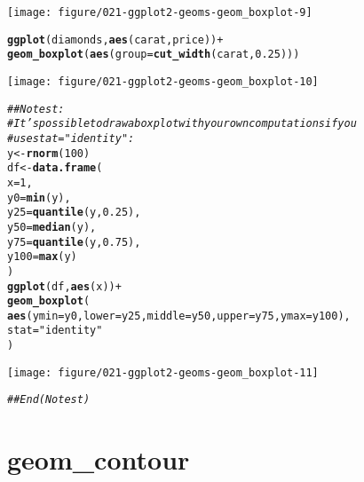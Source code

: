 \documentclass[a4paper,titlepage]{tufte-handout}\usepackage[]{graphicx}\usepackage[]{color}
\makeatletter
\def\maxwidth{ %
  \ifdim\Gin@nat@width>\linewidth
    \linewidth
  \else
    \Gin@nat@width
  \fi
}
\newcommand{\hlnum}[1]{\textcolor[rgb]{0.686,0.059,0.569}{#1}}%
\newcommand{\hlstr}[1]{\textcolor[rgb]{0.192,0.494,0.8}{#1}}%
\newcommand{\hlcom}[1]{\textcolor[rgb]{0.678,0.584,0.686}{\textit{#1}}}%
\newcommand{\hlopt}[1]{\textcolor[rgb]{0,0,0}{#1}}%
\newcommand{\hlstd}[1]{\textcolor[rgb]{0.345,0.345,0.345}{#1}}%
\newcommand{\hlkwb}[1]{\textcolor[rgb]{0.69,0.353,0.396}{#1}}%
\newcommand{\hlkwc}[1]{\textcolor[rgb]{0.333,0.667,0.333}{#1}}%
\newcommand{\hlkwd}[1]{\textcolor[rgb]{0.737,0.353,0.396}{\textbf{#1}}}%
\newenvironment{kframe}{%
 \def\at@end@of@kframe{}%
 \ifinner\ifhmode%
  \def\at@end@of@kframe{\end{minipage}}%
  \begin{minipage}{\columnwidth}%
 \fi\fi%
 \def\FrameCommand##1{\hskip\@totalleftmargin \hskip-\fboxsep
 \colorbox{shadecolor}{##1}\hskip-\fboxsep
     \hskip-\linewidth \hskip-\@totalleftmargin \hskip\columnwidth}%
 \MakeFramed {\advance\hsize-\width
   \@totalleftmargin\z@ \linewidth\hsize
   \@setminipage}}%
 {\par\unskip\endMakeFramed%
 \at@end@of@kframe}
\newenvironment{knitrout}{}{} %
\makeatother
\begin{document}
\begin{knitrout}
\begin{kframe}
{\ttfamily\noindent\color{warningcolor}{\#\# Warning: Continuous x aesthetic -- did you forget aes(group=...)?}}\end{kframe}
\texttt{[image: figure/021-ggplot2-geoms-geom\_boxplot-9]} 
\begin{kframe}\begin{alltt}
\hlkwd{ggplot}\hlstd{(diamonds,} \hlkwd{aes}\hlstd{(carat, price))} \hlopt{+}
  \hlkwd{geom_boxplot}\hlstd{(}\hlkwd{aes}\hlstd{(}\hlkwc{group} \hlstd{=} \hlkwd{cut_width}\hlstd{(carat,} \hlnum{0.25}\hlstd{)))}
\end{alltt}
\end{kframe}
\texttt{[image: figure/021-ggplot2-geoms-geom\_boxplot-10]} 
\begin{kframe}\begin{alltt}
\hlcom{## No test: }
\hlcom{# It's possible to draw a boxplot with your own computations if you}
\hlcom{# use stat = "identity":}
\hlstd{y} \hlkwb{<-} \hlkwd{rnorm}\hlstd{(}\hlnum{100}\hlstd{)}
\hlstd{df} \hlkwb{<-} \hlkwd{data.frame}\hlstd{(}
  \hlkwc{x} \hlstd{=} \hlnum{1}\hlstd{,}
  \hlkwc{y0} \hlstd{=} \hlkwd{min}\hlstd{(y),}
  \hlkwc{y25} \hlstd{=} \hlkwd{quantile}\hlstd{(y,} \hlnum{0.25}\hlstd{),}
  \hlkwc{y50} \hlstd{=} \hlkwd{median}\hlstd{(y),}
  \hlkwc{y75} \hlstd{=} \hlkwd{quantile}\hlstd{(y,} \hlnum{0.75}\hlstd{),}
  \hlkwc{y100} \hlstd{=} \hlkwd{max}\hlstd{(y)}
\hlstd{)}
\hlkwd{ggplot}\hlstd{(df,} \hlkwd{aes}\hlstd{(x))} \hlopt{+}
  \hlkwd{geom_boxplot}\hlstd{(}
   \hlkwd{aes}\hlstd{(}\hlkwc{ymin} \hlstd{= y0,} \hlkwc{lower} \hlstd{= y25,} \hlkwc{middle} \hlstd{= y50,} \hlkwc{upper} \hlstd{= y75,} \hlkwc{ymax} \hlstd{= y100),}
   \hlkwc{stat} \hlstd{=} \hlstr{"identity"}
 \hlstd{)}
\end{alltt}
\end{kframe}
\texttt{[image: figure/021-ggplot2-geoms-geom\_boxplot-11]} 
\begin{kframe}\begin{alltt}
\hlcom{## End(No test)}
\end{alltt}
\end{kframe}
\end{knitrout}


\section{geom\_contour}
\end{document}
